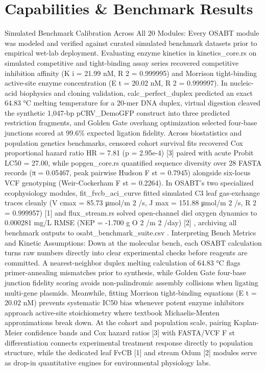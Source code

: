\documentclass[10pt,letterpaper]{article}
\begin{document}
\section{Capabilities \& Benchmark Results}
Simulated Benchmark Calibration Across All 20 Modules: Every OSABT module was modeled and verified against curated simulated benchmark datasets prior to empirical wet-lab deployment. Evaluating enzyme kinetics in kinetics\_core.rs on simulated competitive and tight-binding assay series recovered competitive inhibition affinity (K i = 21.99 nM, R 2 = 0.999995) and Morrison tight-binding active-site enzyme concentration (E t = 20.02 nM, R 2 = 0.999997). In nucleic-acid biophysics and cloning validation, calc\_perfect\_duplex predicted an exact 64.83 °C melting temperature for a 20-mer DNA duplex, virtual digestion cleaved the synthetic 1,047-bp pCRV\_DemoGFP construct into three predicted restriction fragments, and Golden Gate overhang optimization selected four-base junctions scored at 99.6\% expected ligation fidelity. Across biostatistics and population genetics benchmarks, censored cohort survival fits recovered Cox proportional hazard ratio HR = 7.81 (p = 2.95e-4) [3] paired with acute Probit LC50 = 27.00, while popgen\_core.rs quantified sequence diversity over 28 FASTA records (π = 0.05467, peak pairwise Hudson F st = 0.7945) alongside six-locus VCF genotyping (Weir-Cockerham F st = 0.2264). In OSABT's two specialized ecophysiology modules, fit\_fvcb\_aci\_curve fitted simulated C3 leaf gas-exchange traces cleanly (V cmax = 85.73 μmol/m 2 /s, J max = 151.88 μmol/m 2 /s, R 2 = 0.999957) [1] and flux\_stream.rs solved open-channel diel oxygen dynamics to 0.000281 mg/L RMSE (NEP = -1.700 g O 2 /m 2 /day) [2] , archiving all benchmark outputs to osabt\_benchmark\_suite.csv . Interpreting Bench Metrics and Kinetic Assumptions: Down at the molecular bench, each OSABT calculation turns raw numbers directly into clear experimental checks before reagents are committed. A nearest-neighbor duplex melting calculation of 64.83 °C flags primer-annealing mismatches prior to synthesis, while Golden Gate four-base junction fidelity scoring avoids non-palindromic assembly collisions when ligating multi-gene plasmids. Meanwhile, fitting Morrison tight-binding equations (E t = 20.02 nM) prevents systematic IC50 bias whenever potent enzyme inhibitors approach active-site stoichiometry where textbook Michaelis-Menten approximations break down. At the cohort and population scale, pairing Kaplan-Meier confidence bands and Cox hazard ratios [3] with FASTA/VCF F st differentiation connects experimental treatment response directly to population structure, while the dedicated leaf FvCB [1] and stream Odum [2] modules serve as drop-in quantitative engines for environmental physiology labs.
\end{document}
